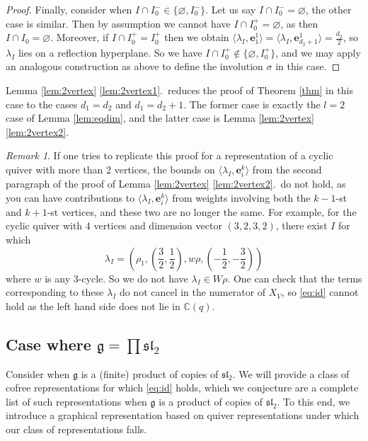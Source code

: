 \documentclass[12pt]{article}
\renewcommand{\b}[1]{\textbf{#1}}
\newcommand{\C}{\mathbb{C}}
\renewcommand{\sl}{\mathfrak{sl}}
\theoremstyle{definition}
\theoremstyle{remark}
\newtheorem{remark}[theorem]{Remark}
\newcommand{\g}{\mathfrak{g}}
\begin{document}
\begin{proof}
    Finally, consider when $I\cap I_0^-\in\{\varnothing,I_0^-\}$. Let us say $I\cap I_0^-=\varnothing$, the other case is similar. Then by assumption we cannot have $I\cap I_0^+=\varnothing$, as then $I\cap I_0=\varnothing$. Moreover, if $I\cap I_0^+=I_0^+$ then we obtain $\langle\lambda_I,\b{e}_1^1\rangle=\langle\lambda_I,\b{e}_{d_2+1}^1\rangle=\frac{d_2}{2}$, so $\lambda_I$ lies on a reflection hyperplane. So we have $I\cap I_0^+\not\in\{\varnothing,I_0^+\}$, and we may apply an analogous construction as above to define the involution $\sigma$ in this case.
\end{proof}

Lemma \ref{lem:2vertex} \ref{lem:2vertex1}.~reduces the proof of Theorem \ref{thm} in this case to the cases $d_1=d_2$ and $d_1=d_2+1$. The former case is exactly the $l=2$ case of Lemma \ref{lem:eqdim}, and the latter case is Lemma \ref{lem:2vertex} \ref{lem:2vertex2}.

\begin{remark}\label{rem:>2}
    If one tries to replicate this proof for a representation of a cyclic quiver with more than 2 vertices, the bounds on $\langle\lambda_I,\b{e}_i^k\rangle$ from the second paragraph of the proof of Lemma \ref{lem:2vertex} \ref{lem:2vertex2}.~do not hold, as you can have contributions to $\langle\lambda_I,\b{e}_i^k\rangle$ from weights involving both the $k-1$-st and $k+1$-st vertices, and these two are no longer the same. For example, for the cyclic quiver with $4$ vertices and dimension vector $(3,2,3,2)$, there exist $I$ for which
    \[\lambda_I=\left(\rho_1,\left(\frac{3}{2},\frac{1}{2}\right),w\rho,\left(-\frac{1}{2},-\frac{3}{2}\right)\right)\]
    where $w$ is any $3$-cycle. So we do not have $\lambda_I\in W\rho$. One can check that the terms corresponding to these $\lambda_I$ do not cancel in the numerator of $X_V$, so \eqref{eq:id} cannot hold as the left hand side does not lie in $\C(q)$.
\end{remark}

\subsection{Case where $\g=\prod\sl_2$}\label{sec:sl2}



Consider when $\g$ is a (finite) product of copies of $\sl_2$. We will provide a class of cofree representations for which \eqref{eq:id} holds, which we conjecture are a complete list of such representations when $\g$ is a product of copies of $\sl_2$. To this end, we introduce a graphical representation based on quiver representations under which our class of representations falls.
\end{document}
